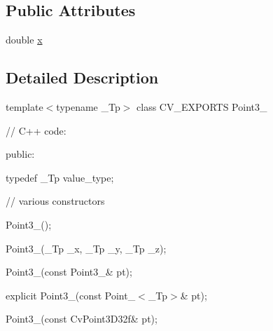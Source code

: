 \subsection*{Public Attributes}
\begin{DoxyCompactItemize}
\item 
double \mbox{\hyperlink{classorg_1_1opencv_1_1core_1_1_point3_a0f6ddd298923e45df4b250ef1c97c270}{x}}
\end{DoxyCompactItemize}


\subsection{Detailed Description}
template$<$typename \+\_\+\+Tp$>$ class C\+V\+\_\+\+E\+X\+P\+O\+R\+TS Point3\+\_\+ {\ttfamily }

{\ttfamily }

{\ttfamily }

{\ttfamily // C++ code\+:}

{\ttfamily }

{\ttfamily }

{\ttfamily public\+:}

{\ttfamily }

{\ttfamily }

{\ttfamily typedef \+\_\+\+Tp value\+\_\+type;}

{\ttfamily }

{\ttfamily }

{\ttfamily // various constructors}

{\ttfamily }

{\ttfamily }

{\ttfamily Point3\+\_\+();}

{\ttfamily }

{\ttfamily }

{\ttfamily Point3\+\_\+(\+\_\+\+Tp \+\_\+x, \+\_\+\+Tp \+\_\+y, \+\_\+\+Tp \+\_\+z);}

{\ttfamily }

{\ttfamily }

{\ttfamily Point3\+\_\+(const Point3\+\_\+\& pt);}

{\ttfamily }

{\ttfamily }

{\ttfamily explicit Point3\+\_\+(const Point\+\_\+$<$\+\_\+\+Tp$>$\& pt);}

{\ttfamily }

{\ttfamily }

{\ttfamily Point3\+\_\+(const Cv\+Point3\+D32f\& pt);}

